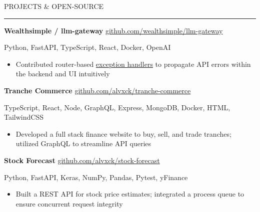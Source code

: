 \documentclass[9pt]{extarticle}
\begin{document}
\vspace{5pt}

\begin{adjustwidth}{4pt}{4pt} \large PROJECTS \& OPEN-SOURCE \end{adjustwidth}
\rule[8pt]{\linewidth}{0.4pt}

\begin{adjustwidth}{10pt}{10pt}
	\vspace{-10pt}

	\textcolor{imptextblack}{\textbf{\large Wealthsimple / llm-gateway}} \hfill \href{https://github.com/wealthsimple/llm-gateway}{github.com/wealthsimple/llm-gateway}
	
	Python, FastAPI, TypeScript, React, Docker, OpenAI
	
	\begin{itemize}[topsep=0pt]
		\item Contributed router-based \href{https://github.com/wealthsimple/llm-gateway/pull/27}{exception handlers} to propagate API errors within the backend and UI intuitively
	\end{itemize}
	
	\vspace{5pt}
	\textcolor{imptextblack}{\textbf{\large Tranche Commerce}} \hfill \href{https://github.com/alvxck/tranche-commerce}{github.com/alvxck/tranche-commerce}
	
	TypeScript, React, Node, GraphQL, Express, MongoDB, Docker, HTML, TailwindCSS
	
	\begin{itemize}[topsep=0pt]
		\item Developed a full stack finance website to buy, sell, and trade tranches; utilized \textcolor{imptextblack}{GraphQL} to streamline API queries
	\end{itemize}
	
	\vspace{5pt}
	\textcolor{imptextblack}{\textbf{\large Stock Forecast}} \hfill \href{https://github.com/alvxck/stock-forecast}{github.com/alvxck/stock-forecast}
	
	Python, FastAPI, Keras, NumPy, Pandas, Pytest, yFinance
	
	\begin{itemize}[topsep=0pt]
		\item Built a REST API for stock price estimates; integrated a process \textcolor{imptextblack}{queue} to ensure concurrent request integrity
	\end{itemize}
\end{adjustwidth}
\end{document}
